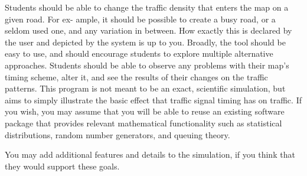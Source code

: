 \begin{enumerate}
Students should be able to change the traffic density that enters the map on a given road. For ex- ample, it should be possible to create a busy road, or a seldom used one, and any variation in between. How exactly this is declared by the user and depicted by the system is up to you. Broadly, the tool should be easy to use, and should encourage students to explore multiple alternative approaches. Students should be able to observe any problems with their map's timing scheme, alter it, and see the results of their changes on the traffic patterns. This program is not meant to be an exact, scientific simulation, but aims to simply illustrate the basic effect that traffic signal timing has on traffic. If you wish, you may assume that you will be able to reuse an existing software package that provides relevant mathematical functionality such as statistical distributions, random number generators, and queuing theory.
\end{enumerate}

You may add additional features and details to the simulation, if you think that they would support these goals.

